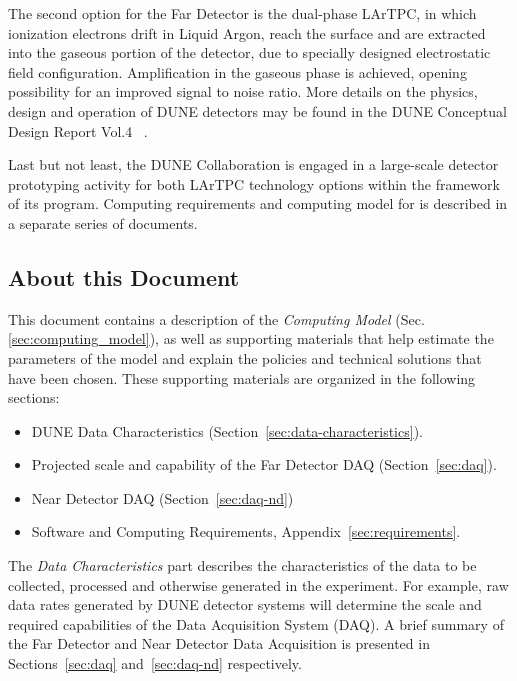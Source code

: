 The second option for the Far Detector is the dual-phase LArTPC, in which ionization electrons 
drift  in Liquid Argon, reach the surface and are extracted into the gaseous portion of the detector,
due to specially designed electrostatic field configuration. Amplification in the gaseous phase
is achieved, opening possibility for an improved signal to noise ratio.
More details on the physics, design and operation of DUNE detectors 
may be found in the DUNE Conceptual Design Report Vol.4 ~\cite{cdr_vol4_docdb}.

Last but not least, the DUNE Collaboration is engaged in a large-scale  detector prototyping
activity for both LArTPC technology options within the framework of its \textit{\pd} program.
Computing requirements and computing model for \pd is described in a separate series of
documents.


\subsection{About this Document}
\label{sec:modelrole}

This document contains a description of the \textit{Computing Model} (Sec.\ref{sec:computing_model}),
as well as supporting materials that help estimate the parameters of the model and
explain the policies and technical solutions that have been chosen.  These supporting materials are
organized in the following sections:

\begin{itemize}
\item DUNE Data Characteristics (Section~\ref{sec:data-characteristics}).
\item Projected scale and capability of the Far Detector DAQ (Section~\ref{sec:daq}).
\item Near Detector DAQ (Section~\ref{sec:daq-nd})
\item Software and Computing Requirements, Appendix~\ref{sec:requirements}.
\end{itemize}

\noindent
The \textit{Data Characteristics} part describes the characteristics of the data to be collected, processed and otherwise generated in the experiment.
For example, raw data rates generated by DUNE detector systems will determine the scale and required capabilities of the Data
Acquisition System (DAQ).  A brief summary of the Far Detector and Near Detector Data Acquisition is presented in Sections~\ref{sec:daq}
and~\ref{sec:daq-nd} respectively.

